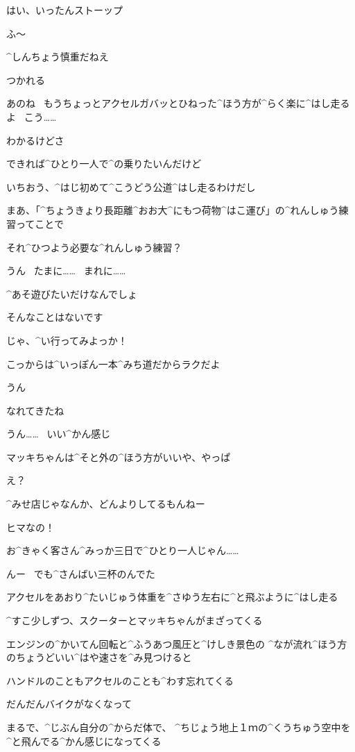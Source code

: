 \page[91]
\A はい、いったんストーップ

\M ふ〜

\A ^{しんちょう}{慎重}だねえ

\M つかれる

\page
\A あのね
\ もうちょっとアクセルガバッとひねった^{ほう}{方}が^{らく}{楽}に^{はし}{走}るよ
\ こう……

\M わかるけどさ

\M できれば^{ひとり}{一人}で^{の}{乗}りたいんだけど

\A いちおう、^{はじ}{初}めて^{こうどう}{公道}^{はし}{走}るわけだし

\A まあ、「^{ちょうきょり}{長距離}^{おお}{大}^{にもつ}{荷物}^{はこ}{運}び」の^{れんしゅう}{練習}ってことで

\M それ^{ひつよう}{必要}な^{れんしゅう}{練習}？

\page
\A うん
\ たまに……
\ まれに……

\M ^{あそ}{遊}びたいだけなんでしょ

\A そんなことはないです

\A じゃ、^{い}{行}ってみよっか！

\A こっからは^{いっぽん}{一本}^{みち}{道}だからラクだよ

\M うん

\page
\A なれてきたね

\M うん……
\ いい^{かん}{感}じ

\page
\A マッキちゃんは^{そと}{外}の^{ほう}{方}がいいや、やっぱ

\M え？

\A ^{みせ}{店}じゃなんか、どんよりしてるもんねー

\M ヒマなの！

\M お^{きゃく}{客}さん^{みっか}{三日}で^{ひとり}{一人}じゃん……

\A んー
\ でも^{さんばい}{三杯}のんでた

\page
\A アクセルをあおり^{たいじゅう}{体重}を^{さゆう}{左右}に^{と}{飛}ぶように^{はし}{走}る

\A ^{すこ}{少}しずつ、スクーターとマッキちゃんがまざってくる

\page
\M エンジンの^{かいてん}{回転}と^{ふうあつ}{風圧}と^{けしき}{景色}の
^{なが}{流}れ^{ほう}{方}のちょうどいい^{はや}{速}さを^{み}{見}つけると

\M ハンドルのこともアクセルのことも^{わす}{忘}れてくる

\M だんだんバイクがなくなって

\M まるで、^{じぶん}{自分}の^{からだ}{体}で、
^{ちじょう}{地上}１ｍの^{くうちゅう}{空中}を^{と}{飛}んでる^{かん}{感}じになってくる

